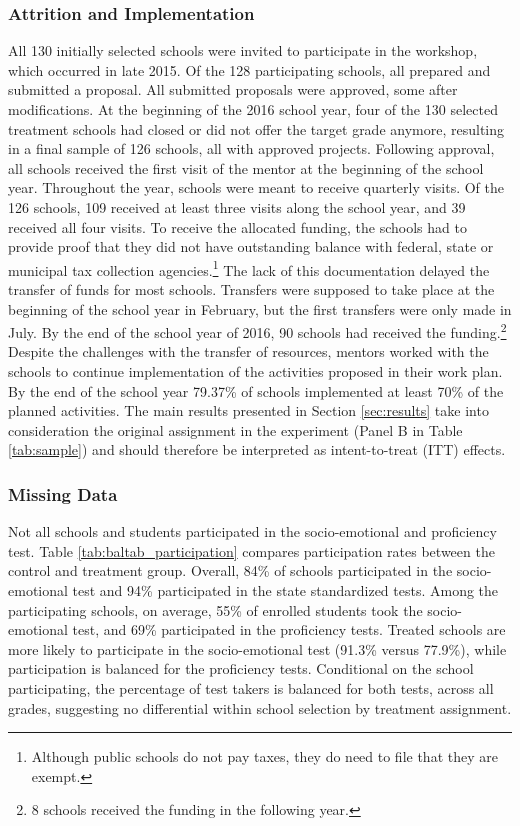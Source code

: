 \documentclass[11pt,a4paper]{article}
\begin{document}
\subsubsection*{Attrition and Implementation}
All 130 initially selected schools were invited to participate in the workshop, which occurred in late 2015. Of the 128 participating schools, all prepared and submitted a proposal. All submitted proposals were approved, some after modifications. At the beginning of the 2016 school year, four of the 130 selected treatment schools had closed or did not offer the target grade anymore, resulting in a final sample of 126 schools, all with approved projects.  Following approval, all schools received the first visit of the mentor at the beginning of the school year. Throughout the year, schools were meant to receive quarterly visits. Of the 126 schools, 109 received at least three visits along the school year, and 39 received all four visits. To receive the allocated funding, the schools had to provide proof that they did not have outstanding balance with federal, state or municipal tax collection agencies.\footnote{Although public schools do not pay taxes, they do need to file that they are exempt.} The lack of this documentation delayed the transfer of funds for most schools. Transfers were supposed to take place at the beginning of the school year in February, but the first transfers were only made in July. By the end of the school year of 2016, 90 schools had received the funding.\footnote{8 schools received the funding in the following year.} Despite the challenges with the transfer of resources, mentors worked with the schools to continue implementation of the activities proposed in their work plan. By the end of the school year 79.37\% of schools implemented at least 70\% of the planned activities. The main results presented in Section \ref{sec:results} take into consideration the original assignment in the experiment (Panel B in Table \ref{tab:sample}) and should therefore be interpreted as intent-to-treat (ITT) effects.

\subsubsection*{Missing Data}
Not all schools and students participated in the socio-emotional and proficiency test. Table \ref{tab:baltab_participation} compares participation rates between the control and treatment group. Overall, 84\% of schools participated in the socio-emotional test and 94\% participated in the state standardized tests. Among the participating schools, on average, 55\% of enrolled students took the socio-emotional test, and 69\% participated in the proficiency tests. Treated schools are more likely to participate in the socio-emotional test (91.3\% versus 77.9\%), while participation is balanced for the proficiency tests. Conditional on the school participating, the percentage of test takers is balanced for both tests, across all grades, suggesting no differential within school selection by treatment assignment. 
\end{document}
